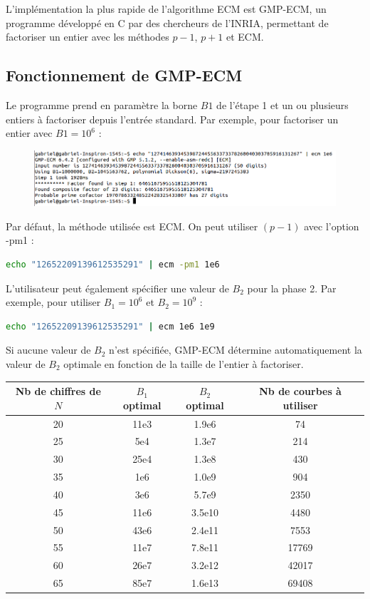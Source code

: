 \documentclass[11pt,a4paper]{article}
\begin{document}
L'implémentation la plus rapide de l'algorithme ECM est GMP-ECM, un programme développé en C par des chercheurs de l'INRIA, permettant de factoriser un entier avec les méthodes $p-1$, $p+1$ et ECM.

\subsection{Fonctionnement de GMP-ECM}
Le programme prend en paramètre la borne $B1$ de l'étape 1 et un ou plusieurs entiers à factoriser depuis   l'entrée standard. Par exemple, pour factoriser un entier avec $B1 = 10^6$ :


\begin{figure}[!h]
\includegraphics[scale=0.5]{images/gmp-ecm1.png}
\end{figure}

Par défaut, la méthode utilisée est ECM. On peut utiliser $(p-1)$ avec l'option -pm1 : 

\begin{lstlisting}[language=bash]
	echo "12652209139612535291" | ecm -pm1 1e6
\end{lstlisting}

L'utilisateur peut également spécifier une valeur de $B_2$ pour la phase 2. Par exemple, pour utiliser $B_1=10^6$ et $B_2=10^9$ : 

\begin{lstlisting}[language=bash]
	echo "12652209139612535291" | ecm 1e6 1e9
\end{lstlisting}

Si aucune valeur de $B_2$ n'est spécifiée, GMP-ECM détermine automatiquement la valeur de $B_2$ optimale en fonction de la taille de l'entier à factoriser.
\medskip

\begin{tabular}{|c|c|c|c|}
  \hline
  Nb de chiffres de $N$ & $B_1$ optimal & $B_2$ optimal & Nb de courbes à utiliser \\
  \hline
  20 & 11e3 & 1.9e6 	& 74  \\
  25 & 5e4 & 1.3e7 & 214 \\
  30 & 25e4 & 1.3e8 & 430 \\
  35 & 1e6 & 1.0e9 & 904 \\
  40 & 3e6 & 5.7e9 & 2350 \\
  45 & 11e6 & 3.5e10 & 4480 \\
  50 & 43e6 & 2.4e11 & 7553 \\
  55 & 11e7 & 7.8e11 & 17769 \\
  60 & 26e7 & 3.2e12 & 42017 \\
  65 & 85e7 & 1.6e13 & 69408 \\
  \hline
\end{tabular}
\end{document}
